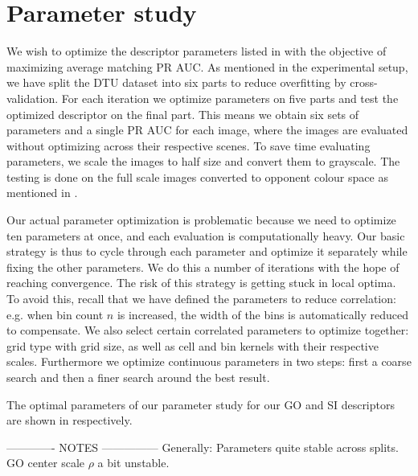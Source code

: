 \documentclass[thesis.tex]{subfiles}
\begin{document}
\section{Parameter study}
\label{sec:icParameterStudy}
%
%
%
%
We wish to optimize the descriptor parameters listed in  with the objective of maximizing average matching PR AUC. As mentioned in the experimental setup, we have split the DTU dataset into six parts to reduce overfitting by cross-validation. For each iteration we optimize parameters on five parts and test the optimized descriptor on the final part. This means we obtain six sets of parameters and a single PR AUC for each image, where the images are evaluated without optimizing across their respective scenes. To save time evaluating parameters, we scale the images to half size and convert them to grayscale. The testing is done on the full scale images converted to opponent colour space as mentioned in .

Our actual parameter optimization is problematic because we need to optimize ten parameters at once, and each evaluation is computationally heavy. Our basic strategy is thus to cycle through each parameter and optimize it separately while fixing the other parameters. We do this a number of iterations with the hope of reaching convergence.
The risk of this strategy is getting stuck in local optima. To avoid this, recall that we have defined the parameters to reduce correlation: e.g. when bin count $n$ is increased, the width of the bins is automatically reduced to compensate. We also select certain correlated parameters to optimize together: grid type with grid size, as well as cell and bin kernels with their respective scales. Furthermore we optimize continuous parameters in two steps: first a coarse search and then a finer search around the best result.

The optimal parameters of our parameter study for our GO and SI descriptors are shown in  respectively.


------------- NOTES ---------------
Generally: Parameters quite stable across splits. GO center scale $\rho$ a bit unstable.
\end{document}
